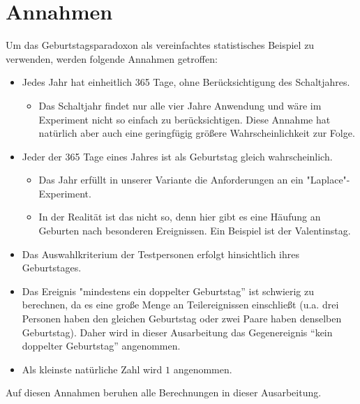 \documentclass[../main.tex]{subfiles}
\begin{document}
    \section{Annahmen}

    Um das Geburtstagsparadoxon als vereinfachtes statistisches Beispiel zu verwenden, werden folgende Annahmen getroffen:

    \begin{itemize}
        \item Jedes Jahr hat einheitlich 365 Tage, ohne Berücksichtigung des Schaltjahres.
        \begin{itemize}
            \item Das Schaltjahr findet nur alle vier Jahre Anwendung und wäre im Experiment nicht so einfach zu berücksichtigen. Diese Annahme hat natürlich aber auch eine geringfügig größere Wahrscheinlichkeit zur Folge.
        \end{itemize}
    \end{itemize}

    \begin{itemize}
        \item Jeder der 365 Tage eines Jahres ist als Geburtstag gleich wahrscheinlich.

        \begin{itemize}
            \item Das Jahr erfüllt in unserer Variante die Anforderungen an ein "Laplace"-Experiment.
        \end{itemize}

        \begin{itemize}
            \item In der Realität ist das nicht so, denn hier gibt es eine Häufung an Geburten nach besonderen Ereignissen. Ein Beispiel ist der Valentinstag.
        \end{itemize}

    \end{itemize}

    \begin{itemize}
        \item Das Auswahlkriterium der Testpersonen erfolgt hinsichtlich ihres Geburtstages.
    \end{itemize}

    \begin{itemize}
        \item Das Ereignis "mindestens ein doppelter Geburtstag” ist schwierig zu berechnen, da es eine große Menge an Teilereignissen einschließt (u.a. drei Personen haben den gleichen Geburtstag oder zwei Paare haben denselben Geburtstag). Daher wird in dieser Ausarbeitung das Gegenereignis “kein doppelter Geburtstag” angenommen.
    \end{itemize}

    \begin{itemize}
        \item Als kleinste natürliche Zahl wird \(1\) angenommen.
    \end{itemize}

    Auf diesen Annahmen beruhen alle Berechnungen in dieser Ausarbeitung.
\end{document}

